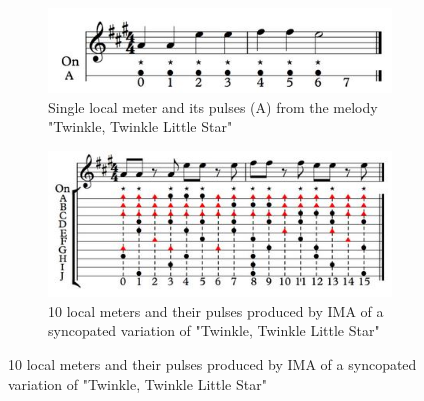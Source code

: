 \begin{figure}[H]
    \centering
    \begin{subfigure}{0.45\textwidth}
        \centering
        \includegraphics[width=\linewidth]{IMAGES/IMA1.JPG}
        \caption{Single local meter and its pulses (A) from the melody "Twinkle, Twinkle Little Star"}
        \label{fig:ima1}
    \end{subfigure}
    \begin{subfigure}{0.45\textwidth}
        \centering
        \includegraphics[width=\linewidth]{IMAGES/IMA2.JPG}
        \caption{10 local meters and their pulses produced by IMA of a syncopated variation of "Twinkle, Twinkle Little Star"}
        \label{fig:ima2}
    \end{subfigure}
    
    \vspace{0.5cm} %


\end{figure}

